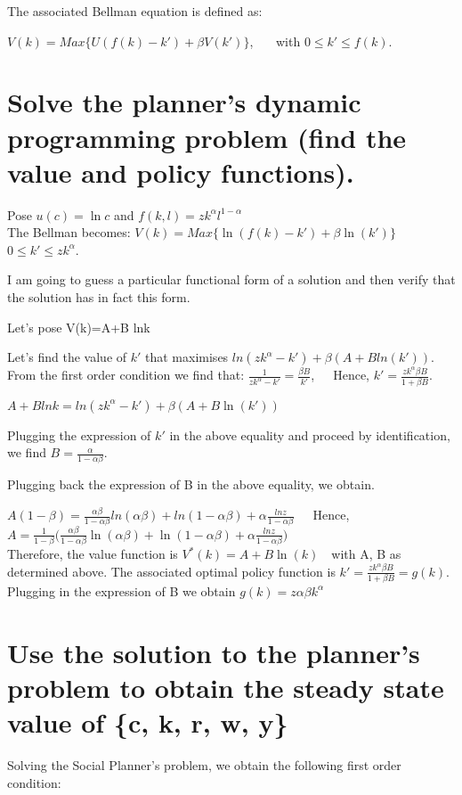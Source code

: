 \documentclass[12pt,a4paper]{article}
\begin{document}
The associated Bellman equation is defined as:

$V(k)=Max \{U(f(k)-k')+\beta V(k')\}$,~~~ with $0 \leq k' \leq f(k)$.

\section{Solve the planner’s dynamic programming
problem (find the value and policy functions).}

Pose $u (c) = \ln c$ and $f(k,l)=zk^{\alpha}l^{1-\alpha}$\\
The Bellman becomes: $V(k)=Max \{\ln(f(k)-k')+\beta \ln(k')\}$~$0 \leq k' \leq zk^{\alpha}$.

I am going to guess a particular functional form of a solution and then verify that the solution has in fact this form.

Let's pose V(k)=A+B lnk

Let's find the value of $k'$ that maximises $ln(zk^{\alpha}-k')+\beta(A+Bln(k'))$. 
From the first order condition we find that: $\frac{1}{zk^{\alpha}-k'}=\frac{\beta B}{k'}$,~~~Hence, $k'=\frac{zk^\alpha\beta B}{1+\beta B}$.

$A+B lnk=ln(zk^\alpha-k')+\beta (A+B \ln(k'))$

Plugging the expression of $k'$ in the above equality and proceed by identification, we find $B=\frac{\alpha}{1-\alpha\beta}$.

Plugging back the expression of B in the above equality, we obtain.

$A(1-\beta)=\frac{\alpha\beta}{1-\alpha\beta}ln(\alpha\beta)+ln(1-\alpha\beta)+\alpha \frac{ln z}{1-\alpha\beta}$~~~Hence, $A=\frac{1}{1-\beta}\big(\frac{\alpha\beta}{1-\alpha\beta} \ln(\alpha\beta)+\ln(1-\alpha\beta)+\alpha \frac{ln z}{1-\alpha\beta} \big)$ \\

Therefore, the value function is $V^*(k)=A+B \ln(k)$~~with A, B
as determined above. The associated optimal policy function is $k'=\frac{zk^\alpha\beta B}{1+\beta B}=g(k)$. Plugging in the expression of B we obtain $g(k)=z\alpha \beta k^\alpha $

\section{Use the solution to the planner’s problem to obtain the steady state value of \{c, k, r, w, y\}}

Solving the Social Planner's problem, we obtain the following first order condition:
\end{document}
